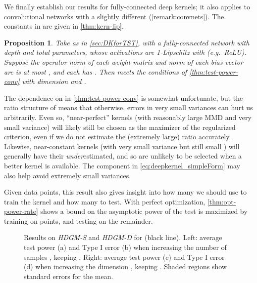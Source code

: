 \documentclass{article}
\newtheorem{prop}[theorem]{Proposition}  \crefname{prop}{Proposition}{Propositions}
\begin{document}
We finally establish our results for fully-connected deep kernels;
it also applies to convolutional networks with a slightly different  (\cref{remark:convnets}).
The constants in  are given in \cref{thm:kern-lip}.
\begin{prop} \label{thm:main-kern-lip}
    Take  as in \cref{sec:DKforTST},
    with  a fully-connected network with depth  and  total parameters,
    whose activations are 1-Lipschitz with  (e.g.\ ReLU).
    Suppose the operator norm of each weight matrix and  norm of each bias vector are is at most ,
    and each  has .
    Then  meets the conditions of \cref{thm:test-power-conv}
    with dimension  and 
    .
\end{prop}








The dependence on  in \cref{thm:test-power-conv} is somewhat unfortunate,
but the ratio structure of  means that otherwise,
errors in very small variances can hurt us arbitrarily.
Even so,
``near-perfect'' kernels (with reasonably large MMD and very small variance)
will likely still be chosen as the maximizer of the regularized criterion,
even if we do not estimate the (extremely large) ratio accurately.
Likewise, near-constant kernels (with very small variance but still small )
will generally have their  \emph{under}estimated,
and so are unlikely to be selected
when a better kernel is available. The  component in \eqref{eq:deepkernel_simpleForm}
may also help avoid extremely small variances.

Given  data points,
this result also gives insight into how many we should use to train the kernel
and how many to test.
With perfect optimization,
\cref{thm:opt-power-rate}
shows a bound on the asymptotic power of the test is maximized by
training on  points,
and testing on the remainder.


\begin{figure*}[!t]
    \begin{center}
        \subfigure
        {}
        \vspace{-0.3cm}
        \caption{Results on \emph{HDGM-S} and \emph{HDGM-D} for  (black line).
        Left: average test power (a) and Type I error (b) when increasing the number of samples , keeping .
        Right: average test power (c) and Type I error (d) when increasing the dimension , keeping . Shaded regions show standard errors for the mean.}  \label{fig:HDGM_RES}
    \end{center}
    \vspace{-1em}
\end{figure*}
\end{document}
